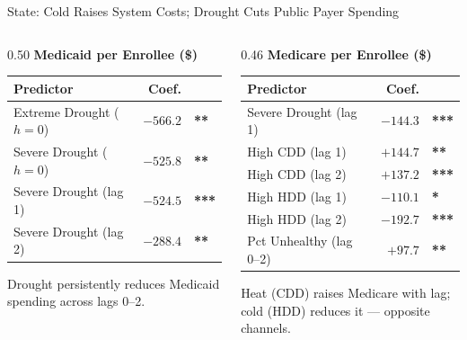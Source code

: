 \documentclass[aspectratio=169,11pt]{beamer}
\newcommand{\emphcolor}[1]{{\color{WarmOrange}\textbf{#1}}}
\newcommand{\tealtext}[1]{{\color{Teal}#1}}
\newcommand{\graytext}[1]{{\color{WarmGray}#1}}
\begin{document}
\begin{frame}{State: Cold Raises System Costs; Drought Cuts Public Payer Spending}
\begin{columns}[T]
\begin{column}{0.50\textwidth}
      \tealtext{\textbf{Medicaid per Enrollee (\$)}}\\[0.25em]
      \begin{tabular}{lrl}
        \toprule
        Predictor & Coef. & \\
        \midrule
        Extreme Drought ($h{=}0$) & $-566.2$ & \emphcolor{**}  \\
        Severe Drought ($h{=}0$)  & $-525.8$ & \emphcolor{**}  \\
        Severe Drought (lag 1)    & $-524.5$ & \emphcolor{***} \\
        Severe Drought (lag 2)    & $-288.4$ & \emphcolor{**}  \\
        \bottomrule
      \end{tabular}
      \vspace{0.2em}
      \graytext{\scriptsize Drought persistently reduces Medicaid\\spending across lags 0--2.}
    \end{column}
    \begin{column}{0.46\textwidth}
      \tealtext{\textbf{Medicare per Enrollee (\$)}}\\[0.25em]
      \begin{tabular}{lrl}
        \toprule
        Predictor & Coef. & \\
        \midrule
        Severe Drought (lag 1)   & $-144.3$ & \emphcolor{***} \\
        High CDD (lag 1)         & $+144.7$ & \emphcolor{**}  \\
        High CDD (lag 2)         & $+137.2$ & \emphcolor{***} \\
        High HDD (lag 1)         & $-110.1$ & \emphcolor{*}   \\
        High HDD (lag 2)         & $-192.7$ & \emphcolor{***} \\
        Pct Unhealthy (lag 0--2) & $+97.7$  & \emphcolor{**}  \\
        \bottomrule
      \end{tabular}
      \vspace{0.2em}
      \graytext{\scriptsize Heat (CDD) raises Medicare with lag;\\cold (HDD) reduces it — opposite channels.}
    \end{column}
  \end{columns}
\end{frame}
\end{document}
